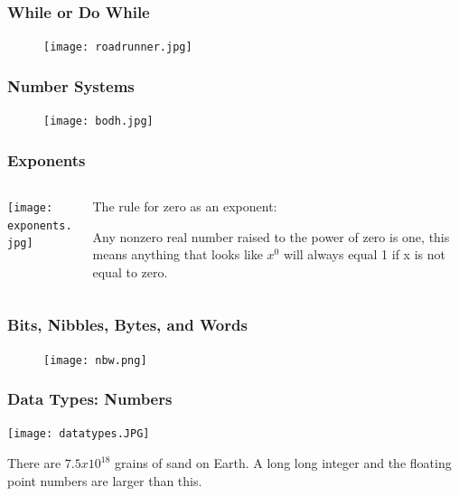 \documentclass{beamer}
\begin{document}
\begin{frame}
\frametitle{While or Do While}
\begin{figure}
\texttt{[image: roadrunner.jpg]} 
\end{figure}
\end{frame}



\begin{frame}\frametitle{Number Systems}
\begin{figure}[h]
	\texttt{[image: bodh.jpg]}
\end{figure}
\end{frame}


\begin{frame}\frametitle{Exponents}
\begin{columns}
\begin{column}{5cm}
\begin{center}
\texttt{[image: exponents.jpg]}
\end{center}
\end{column}
\begin{column}{5cm}
The rule for zero as an exponent:

\vspace{0.25cm}

Any nonzero real number raised to the power of zero is one, this means anything that looks like $x^0$ will always equal 1 if x is not equal to zero. 
\end{column}
\end{columns}
\end{frame}

\begin{frame}\frametitle{Bits, Nibbles, Bytes, and Words}
\begin{figure}[h]
	\texttt{[image: nbw.png]}
\end{figure}
\end{frame}

\begin{frame}\frametitle{Data Types: Numbers}
\texttt{[image: datatypes.JPG]}
\vspace{0.5cm}

There are $7.5 x 10^{18}$ grains of sand on Earth. A long long integer and the floating point numbers are larger than this. 
\end{frame}

\end{document}
